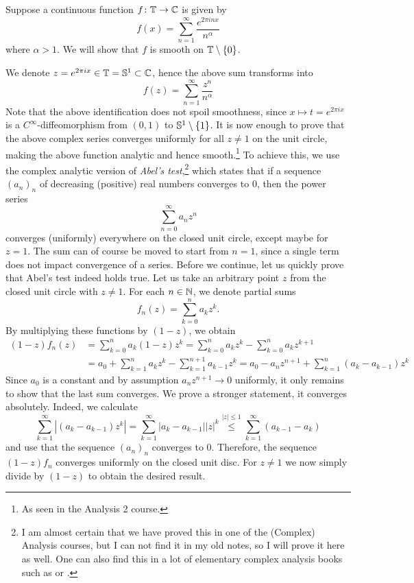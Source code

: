 \documentclass[a4paper, 12pt]{article}
\begin{document}
\begin{Exercise}
    Suppose a continuous function $f \colon \T \to \C$ is given by
    \[
        f(x) = \sum_{n=1}^{\infty}\frac{e^{2\pi i n x}}{n^\alpha}
    \]
    where $\alpha > 1$. We will show that $f$ is smooth on $\T\setminus\left\{ 0 \right\}$.

    We denote $z = e^{2\pi i x} \in \T = \S^1 \subset \C$,
    hence the above sum transforms into
    \[
        f(z) = \sum_{n = 1}^{\infty} \frac{z^n}{n^\alpha}
    \]
    Note that the above identification does not spoil smoothness, since $x
    \mapsto t = e^{2\pi i x}$ is a $C^\infty$-diffeomorphism from $(0, 1)$ to
    $\S^1\setminus\left\{ 1 \right\}$.
    It is now enough to prove that the above complex series converges uniformly
    for all $z \neq 1$ on the unit circle, making the above function analytic
    and hence smooth.\footnote{As seen in the Analysis 2 course.} To achieve
    this, we use the complex analytic version of \emph{Abel's test},\footnote{I
    am almost certain that we have proved this in one of the (Complex) Analysis
    courses, but I can not find it in my old notes, so I will prove it here as
    well. One can also find this in a lot of elementary complex analysis books
    such as \cite[p.\ 80]{Macrobert1954} or \cite[pp.\ 91--92]{Moretti1964}.}
    which states that if a sequence $(a_n)_n$ of decreasing (positive) real
    numbers converges to $0$, then the power series
    \[
        \sum_{n=0}^{\infty} a_n z^n
    \]
    converges (uniformly) everywhere on the closed unit circle, except maybe
    for $z = 1$.  The sum can of course be moved to start from $n = 1$, since a
    single term does not impact convergence of a series.
    Before we continue, let us quickly prove that Abel's test indeed holds true.
    Let us take an arbitrary point $z$ from the closed unit circle with $z \neq 1$.
    For each $n \in \N$, we denote partial sums
    \[
        f_n(z) = \sum_{k = 0}^{n} a_k z^k.
    \]
    By multiplying these functions by $(1 - z)$, we obtain
    \begin{align*}
        (1 - z) f_n(z)
        &= \sum_{k = 0}^{n} a_k (1 - z) z^k
        = \sum_{k = 0}^{n} a_k z^k - \sum_{k = 0}^{n} a_k z^{k+1} \\
        &= a_0 + \sum_{k = 1}^{n}a_k z^k - \sum_{k = 1}^{n+1}a_{k-1}z^k
        = a_0 - a_n z^{n+1} + \sum_{k = 1}^{n}(a_k - a_{k-1}) z^k
    \end{align*}
    Since $a_0$ is a constant and by assumption $a_n z^{n+1} \to 0$ uniformly,
    it only remains to show that the last sum converges.
    We prove a stronger statement, it converges absolutely. Indeed, we calculate
    \[
        \sum_{k = 1}^{\infty} |(a_k - a_{k-1})z^k|
        = \sum_{k = 1}^{\infty} |a_k - a_{k-1}| |z|^k
        \overset{|z|\leq 1}{\leq} \sum_{k = 1}^{\infty} (a_{k-1} - a_k)
    \]
    and use that the sequence $(a_n)_n$ converges to $0$.
    Therefore, the sequence $(1 - z)f_n$ converges uniformly on the closed unit disc.
    For $z \neq 1$ we now simply divide by $(1 - z)$ to obtain the desired result.


\end{Exercise}
\end{document}

